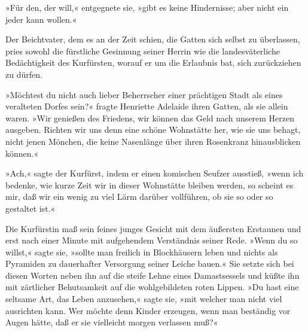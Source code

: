 »Für den, der will,« entgegnete sie, »gibt es keine Hindernisse;
aber nicht ein jeder kann wollen.«

Der Beichtvater, dem es an der Zeit schien, die Gatten sich selbst
zu überlassen, pries sowohl die fürstliche Gesinnung seiner Herrin
wie die landesväterliche Bedächtigkeit des Kurfürsten, worauf er um
die Erlaubnis bat, sich zurückziehen zu dürfen.

»Möchtest du nicht auch lieber Beherrscher einer prächtigen Stadt
als eines veralteten Dorfes sein?« fragte Henriette Adelaide ihren
Gatten, als sie allein waren. »Wir genießen des Friedens, wir
können das Geld nach unserem Herzen ausgeben. Richten wir uns denn
eine schöne Wohnstätte her, wie sie uns behagt, nicht jenen
Mönchen, die keine Nasenlänge über ihren Rosenkranz hinausblicken
können.«

\pagenum{[102]} »Ach,« sagte der Kurfürst, indem er einen komischen
Seufzer ausstieß, »wenn ich bedenke, wie kurze Zeit wir in dieser
Wohnstätte bleiben werden, so scheint es mir, daß wir ein wenig zu
viel Lärm darüber vollführen, ob sie so oder so gestaltet ist.«

Die Kurfürstin maß sein feines junges Gesicht mit dem äußersten
Erstaunen und erst nach einer Minute mit aufgehendem Verständnis
seiner Rede. »Wenn du so willst,« sagte sie, »sollte man freilich
in Blockhäusern leben und nichts als Pyramiden zu dauerhafter
Versorgung seiner Leiche bauen.« Sie setzte sich bei diesen Worten
neben ihn auf die steife Lehne eines Damastsessels und küßte ihn
mit zärtlicher Behutsamkeit auf die wohlgebildeten roten Lippen.
»Du hast eine seltsame Art, das Leben anzusehen,« sagte sie, »mit
welcher man nicht viel ausrichten kann. Wer möchte denn Kinder
erzeugen, wenn man beständig vor Augen hätte, daß er sie vielleicht
morgen verlassen muß?«

